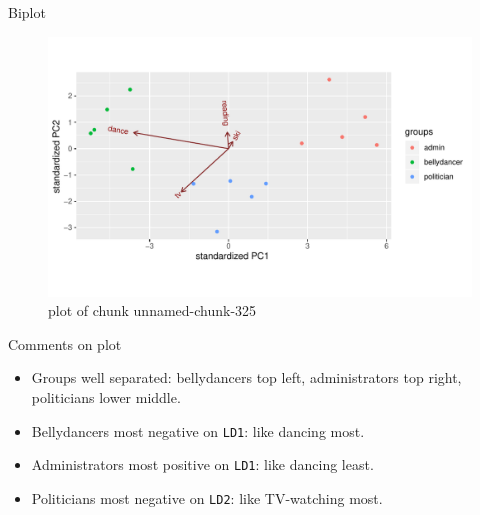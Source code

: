 \documentclass[ignorenonframetext,]{beamer}
\newenvironment{Shaded}{\begin{snugshade}}{\end{snugshade}}
\newcommand{\DataTypeTok}[1]{\textcolor[rgb]{0.13,0.29,0.53}{#1}}
\newcommand{\FloatTok}[1]{\textcolor[rgb]{0.00,0.00,0.81}{#1}}
\newcommand{\KeywordTok}[1]{\textcolor[rgb]{0.13,0.29,0.53}{\textbf{#1}}}
\newcommand{\NormalTok}[1]{#1}
\newcommand{\OperatorTok}[1]{\textcolor[rgb]{0.81,0.36,0.00}{\textbf{#1}}}
\begin{document}
\begin{frame}[fragile]{Biplot}
\protect\hypertarget{biplot}{}

\begin{Shaded}
\end{Shaded}

\begin{figure}
\centering
\includegraphics{figure/unnamed-chunk-325-1.pdf}
\caption{plot of chunk unnamed-chunk-325}
\end{figure}

\end{frame}

\begin{frame}[fragile]{Comments on plot}
\protect\hypertarget{comments-on-plot}{}

\begin{itemize}
\item
  Groups well separated: bellydancers top left, administrators top
  right, politicians lower middle.
\item
  Bellydancers most negative on \texttt{LD1}: like dancing most.
\item
  Administrators most positive on \texttt{LD1}: like dancing least.
\item
  Politicians most negative on \texttt{LD2}: like TV-watching most.
\end{itemize}

\end{frame}
\end{document}
